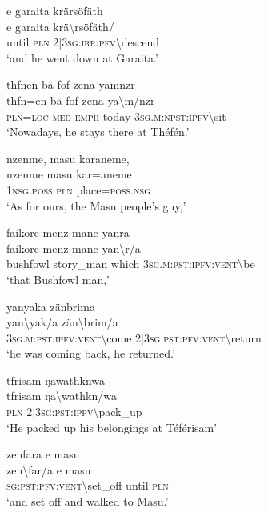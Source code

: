 \ea\label{ex:3:a7602}
e garaita krärsöfäth\\
\gll e	garaita	krä{\textbackslash}rsöfäth/\\
     until	\textsc{pln}	2|3\textsc{sg}:\textsc{irr}:\textsc{pfv}{\textbackslash}descend\\
\glt `and he went down at Garaita.'
\z

\ea\label{ex:3:a7603}
thfnen bä fof zena yamnzr\\
\gll thfn=en	bä	fof	zena	ya{\textbackslash}m/nzr\\
     \textsc{pln}=\textsc{loc}	\textsc{med}	\textsc{emph}	today	3\textsc{sg}.\textsc{m}:\textsc{npst}:\textsc{ipfv}{\textbackslash}sit\\
\glt `Nowadays, he stays there at Théfén.'
\z

\ea\label{ex:3:a7604}
nzenme, masu karaneme,\\
\gll nzenme	masu	kar=aneme\\
     1\textsc{nsg}.\textsc{poss}	\textsc{pln}	place=\textsc{poss}.\textsc{nsg}\\
\glt `As for ours, the Masu people's guy,'
\z

\ea\label{ex:3:a7606}
faikore menz mane yanra\\
\gll faikore	menz	mane	yan{\textbackslash}r/a\\
     bushfowl	story\_man	which	3\textsc{sg}.\textsc{m}:\textsc{pst}:\textsc{ipfv}:\textsc{vent}{\textbackslash}be\\
\glt `that Bushfowl man,'
\z

\ea\label{ex:3:a7607}
yanyaka zänbrima\\
\gll yan{\textbackslash}yak/a	zän{\textbackslash}brim/a\\
     3\textsc{sg}.\textsc{m}:\textsc{pst}:\textsc{ipfv}:\textsc{vent}{\textbackslash}come	2|3\textsc{sg}:\textsc{pst}:\textsc{pfv}:\textsc{vent}{\textbackslash}return\\
\glt `he was coming back, he returned.'
\z

\ea\label{ex:3:a10499}
tfrisam ŋawathknwa\\
\gll tfrisam	ŋa{\textbackslash}wathkn/wa\\
     \textsc{pln}	2|3\textsc{sg}:\textsc{pst}:\textsc{ipfv}{\textbackslash}pack\_up\\
\glt `He packed up his belongings at Téférisam'
\z

\ea\label{ex:3:a7609}
zenfara e masu\\
\gll zen{\textbackslash}far/a	e	masu\\
     \textsc{sg}:\textsc{pst}:\textsc{pfv}:\textsc{vent}{\textbackslash}set\_off	until	\textsc{pln}\\
\glt `and set off and walked to Masu.'
\z

